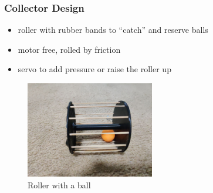 \documentclass[12pt]{beamer}
\begin{document}
\begin{frame}
    \frametitle{Collector Design}
    \begin{itemize}
        \item roller with rubber bands to ``catch'' and reserve balls
        \item motor free, rolled by friction
        \item servo to add pressure or raise the roller up
    \end{itemize}
    \begin{figure}[H]
        \centering
        \includegraphics[width=0.5\textwidth]{Picture/collector.jpg}
        \caption{Roller with a ball}
    \end{figure}
\end{frame}
\end{document}

